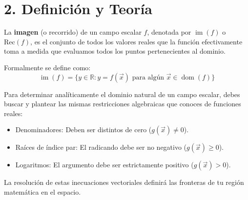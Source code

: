 \documentclass[11pt]{article}
\newenvironment{teoria}{%
  \section*{2. Definición y Teoría}%
}{}
\newenvironment{definicion}[1]{%
  \begin{tcolorbox}[colback=blue!5,colframe=blue!75!black,title=Definición: #1]%
}{%
  \end{tcolorbox}%
}
\newenvironment{procesamiento}[1]{%
  \begin{tcolorbox}[colback=gray!5,colframe=gray!60!black,title=Procedimiento: #1]%
}{%
  \end{tcolorbox}%
}
\begin{document}
\begin{teoria}
  \begin{definicion}{Imagen o Recorrido}
    La \textbf{imagen} (o recorrido) de un campo escalar $f$, denotada por $\operatorname{im}(f)$ o $\text{Rec}(f)$, es el conjunto de todos los valores reales que la función efectivamente toma a medida que evaluamos todos los puntos pertenecientes al dominio.
    
    Formalmente se define como:
    $$ \operatorname{im}(f) = \{ y \in \mathbb{R} \colon y = f(\vec{x}) \text{ para algún } \vec{x} \in \operatorname{dom}(f) \} $$
  \end{definicion}

  \begin{procesamiento}{Restricciones Clásicas de Dominio}
    Para determinar analíticamente el dominio natural de un campo escalar, debes buscar y plantear las mismas restricciones algebraicas que conoces de funciones reales: \begin{itemize}
      \item Denominadores: Deben ser distintos de cero ($g(\vec{x}) \neq 0$).
      \item Raíces de índice par: El radicando debe ser no negativo ($g(\vec{x}) \geq 0$).
      \item Logaritmos: El argumento debe ser estrictamente positivo ($g(\vec{x}) > 0$).
    \end{itemize}
    La resolución de estas inecuaciones vectoriales definirá las fronteras de tu región matemática en el espacio.
  \end{procesamiento}
\end{teoria}
\end{document}
